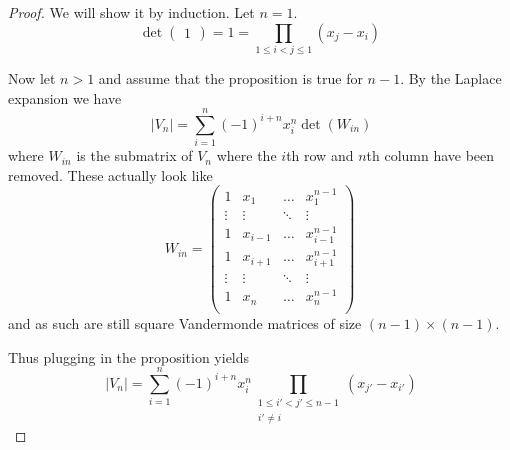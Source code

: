 \documentclass[10pt,a4paper]{article}
\begin{document}
\begin{proof}
  We will show it by induction.
  Let $n = 1$.
  \begin{equation*}
    \det \begin{pmatrix}1\end{pmatrix} = 1 = \prod_{1 \le i < j \le 1} (x_{j} - x_{i})
  \end{equation*}

  Now let $n > 1$ and assume that the proposition is true for $n - 1$.
  By the Laplace expansion we have
  \begin{equation*}
    ~|V_{n}| = \sum_{i = 1}^{n} (-1)^{i + n} x_{i}^{n} \det(W_{in})
  \end{equation*}
  where $W_{in}$ is the submatrix of $V_{n}$ where the $i$th row and $n$th column have been removed.
  These actually look like
  \begin{equation*}
    W_{in} = \begin{pmatrix}
      1 & x_{1} & \dots & x_{1}^{n - 1}\\
      \vdots & \vdots & \ddots & \vdots\\
      1 & x_{i - 1} & \dots & x_{i - 1}^{n - 1}\\
      1 & x_{i + 1} & \dots & x_{i + 1}^{n - 1}\\
      \vdots & \vdots & \ddots & \vdots\\
      1 & x_{n} & \dots & x_{n}^{n - 1}\\
    \end{pmatrix}
  \end{equation*}
  and as such are still square Vandermonde matrices of size $(n - 1) \times (n - 1)$.

  Thus plugging in the proposition yields
  \begin{equation*}
    ~|V_{n}| = \sum_{i = 1}^{n} (-1)^{i + n} x_{i}^{n} \prod_{\substack{1 \le i' < j' \le n - 1\\i' \ne i}} (x_{j'} - x_{i'})
  \end{equation*}
\end{proof}
\end{document}
